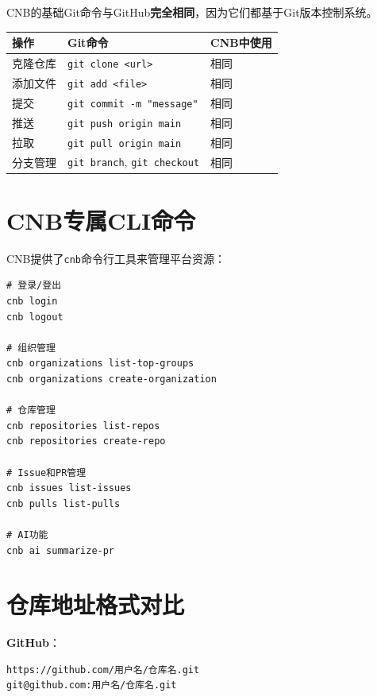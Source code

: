 CNB的基础Git命令与GitHub\textbf{完全相同}，因为它们都基于Git版本控制系统。

\begin{table}[H]
\centering
\begin{tabular}{lll}
\toprule
\textbf{操作} & \textbf{Git命令} & \textbf{CNB中使用} \\
\midrule
克隆仓库 & \texttt{git clone <url>} & 相同 \\
添加文件 & \texttt{git add <file>} & 相同 \\
提交 & \texttt{git commit -m "message"} & 相同 \\
推送 & \texttt{git push origin main} & 相同 \\
拉取 & \texttt{git pull origin main} & 相同 \\
分支管理 & \texttt{git branch}, \texttt{git checkout} & 相同 \\
\bottomrule
\end{tabular}
\end{table}

\section{CNB专属CLI命令}

CNB提供了\texttt{cnb}命令行工具来管理平台资源：

\begin{lstlisting}[style=shell]
# 登录/登出
cnb login
cnb logout

# 组织管理
cnb organizations list-top-groups
cnb organizations create-organization

# 仓库管理
cnb repositories list-repos
cnb repositories create-repo

# Issue和PR管理
cnb issues list-issues
cnb pulls list-pulls

# AI功能
cnb ai summarize-pr
\end{lstlisting}

\section{仓库地址格式对比}

\textbf{GitHub}：

\begin{lstlisting}[style=shell]
https://github.com/用户名/仓库名.git
git@github.com:用户名/仓库名.git
\end{lstlisting}


